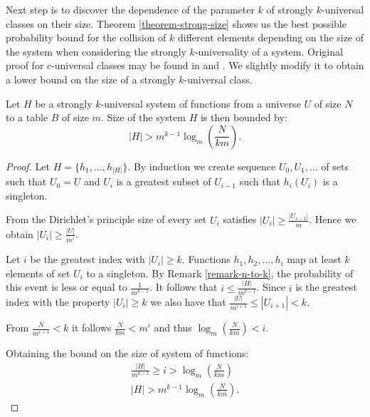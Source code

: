 Next step is to discover the dependence of the parameter $k$ of strongly $k$-universal classes on their size. Theorem \ref{theorem-strong-size} shows us the best possible probability bound for the collision of $k$ different elements depending on the size of the system when considering the strongly $k$-universality of a system. Original proof for $c$-universal classes may be found in \cite{DBLP:books/sp/Mehlhorn84} and \cite{VK-skripta}. We slightly modify it to obtain a lower bound on the size of a strongly $k$-universal class.
\begin{theorem}
\label{theorem-strong-size}
Let $H$ be a strongly $k$-universal system of functions from a universe $U$ of size $N$ to a table $B$ of size $m$. Size of the system $H$ is then bounded by:
\begin{displaymath}
|H| > m^{k - 1} \log_m \left( \frac{N}{km} \right) \text{.}
\end{displaymath}
\end{theorem}
\begin{proof}
Let $H = \{h_1, \dots, h_{|H|}\}$. By induction we create sequence $U_0, U_1, \dots$ of sets such that $U_0 = U$ and $U_i$ is a greatest subset of $U_{i - 1}$ such that $h_i(U_i)$ is a singleton. 

From the Dirichlet's principle size of every set $U_i$ satisfies $|U_i| \geq \frac{|U_{i - 1}|}{m}$. Hence we obtain $|U_i| \geq \frac{|U|}{m^i}$.

Let $i$ be the greatest index with $|U_i| \geq k$. Functions $h_1, h_2,\dots, h_i$ map at least $k$ elements of set $U_i$ to a singleton. By Remark \ref{remark-n-to-k}, the probability of this event is less or equal to $\frac{1}{m ^ {k-1}}$. It follows that $i \leq \frac{|H|}{m ^ {k - 1}}$. Since $i$ is the greatest index with the property $|U_i| \geq k$ we also have that $\frac{|U|}{m ^ {i + 1}} \leq |U_{i + 1}| < k$. 

From $\frac{N}{m^{i + 1}} < k$ it follows $\frac{N}{km} < m ^ {i}$ and thus $\log_m \left( \frac{N}{km} \right) < i$.

Obtaining the bound on the size of system of functions:
\begin{gather*}
\frac{|H|}{m^{k - 1}} \geq i > \log_m \left( \frac{N}{km} \right) \\
|H| > m^{k - 1} \log_m \left( \frac{N}{km} \right) \text{.}
\end{gather*}
\end{proof}

